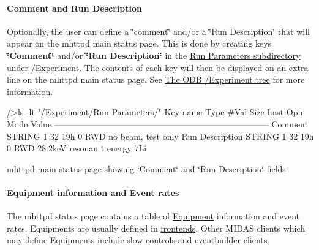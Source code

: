 \par
 \hypertarget{RC_mhttpd_status_page_features_RC_Edit_RP}{}\paragraph{Comment and Run Description}\label{RC_mhttpd_status_page_features_RC_Edit_RP}
Optionally, the user can define a \char`\"{}comment\char`\"{} and/or a \char`\"{}Run Description\char`\"{} that will appear on the mhttpd main status page. This is done by creating keys {\bfseries \char`\"{}Comment\char`\"{}} and/or {\bfseries \char`\"{}Run Description\char`\"{}} in the \hyperlink{RC_customize_ODB_RC_Run_Parameters}{Run Parameters subdirectory} under /Experiment. The contents of each key will then be displayed on an extra line on the mhttpd main status page. See \hyperlink{RC_customize_ODB_RC_ODB_Experiment_Tree}{The ODB /Experiment tree} for more information.


\begin{DoxyCode}
/>ls -lt "/Experiment/Run Parameters/"
Key name                        Type    #Val  Size  Last Opn Mode Value
---------------------------------------------------------------------------
Comment                         STRING  1     32    19h  0   RWD   no beam, test 
      only
Run Description                 STRING  1     32    19h  0   RWD  28.2keV resonan
      t energy 7Li
\end{DoxyCode}


\par
 \begin{center} mhttpd main status page showing \char`\"{}Comment\char`\"{} and \char`\"{}Run Description\char`\"{} fields  \end{center}  \par


\par


\label{RC_mhttpd_status_page_features_idx_mhttpd_page_status_equipment}
\hypertarget{RC_mhttpd_status_page_features_idx_mhttpd_page_status_equipment}{}
 \hypertarget{RC_mhttpd_status_page_features_RC_mhttpd_status_Equipment_info}{}\paragraph{Equipment information and Event rates}\label{RC_mhttpd_status_page_features_RC_mhttpd_status_Equipment_info}
The mhttpd status page contains a table of \hyperlink{FrontendOperation_FE_sw_equipment}{Equipment} information and event rates. Equipments are usually defined in \hyperlink{FrontendOperation_FE_features}{frontends}. Other MIDAS clients which may define Equipments include slow controls and eventbuilder clients.

